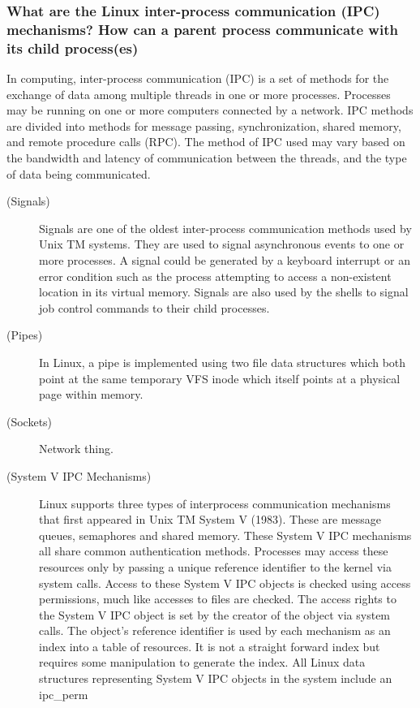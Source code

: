 \documentclass{article}
\begin{document}
\subsubsection{What are the Linux inter-process communication (IPC) mechanisms? How can a parent
process communicate with its child process(es)}
\textsf{In computing, inter-process communication (IPC) is a set of methods for the exchange of data among multiple threads 
in one or more processes. Processes may be running on one or more computers connected by a network. IPC methods are divided 
into methods for message passing, synchronization, shared memory, and remote procedure calls (RPC). The method of IPC used 
may vary based on the bandwidth and latency of communication between the threads, and the type of data being communicated.}
\begin{description}
\item[(Signals)] Signals are one of the oldest inter-process communication methods used by Unix TM systems. They are used to 
signal asynchronous events to one or more processes. A signal could be generated by a keyboard interrupt or an error condition such 
as the process attempting to access a non-existent location in its virtual memory. Signals are also used by the shells to signal 
job control commands to their child processes.
\item[(Pipes)] In Linux, a pipe is implemented using two file data structures which both point at the same temporary VFS inode 
which itself points at a physical page within memory. 
\item[(Sockets)] Network thing.
\item[(System V IPC Mechanisms)] Linux supports three types of interprocess communication mechanisms that first appeared in 
Unix TM System V (1983). These are message queues, semaphores and shared memory. These System V IPC mechanisms all share common authentication methods. 
Processes may access these resources only by passing a unique reference identifier to the kernel via system calls. Access to these System V 
IPC objects is checked using access permissions, much like accesses to files are checked. The access rights to the System V IPC object is set by the 
creator of the object via system calls. The object's reference identifier is used by each mechanism as an index into a table of resources. 
It is not a straight forward index but requires some manipulation to generate the index.
All Linux data structures representing System V IPC objects in the system include an ipc\_perm


\end{description}
\end{document}
